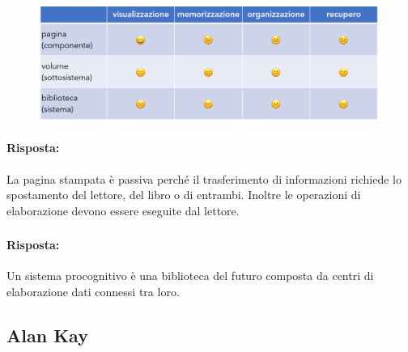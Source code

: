 
\begin{figure}[h]
    \centering
    \includegraphics[scale=0.25]{images/Schemi.png}
\end{figure}


\paragraph{Risposta:} La pagina stampata è passiva perché il trasferimento di informazioni richiede lo spostamento del 
lettore, del libro o di entrambi. Inoltre le operazioni di elaborazione devono essere eseguite dal lettore.

\subsubsection{}


\paragraph{Risposta:} Un sistema procognitivo è una biblioteca del futuro composta da centri di elaborazione dati
connessi tra loro.

\subsection{Alan Kay}

